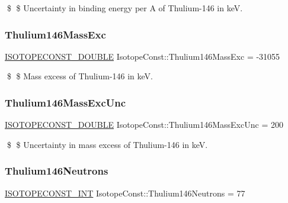 \$ \$ Uncertainty in binding energy per A of Thulium-\/146 in keV. \mbox{\label{group___isotope_const-_thulium-_tm146_ga506451444ec185ead3cec387ee123927}} 
\subsubsection{\texorpdfstring{Thulium146\+Mass\+Exc}{Thulium146MassExc}}
{\footnotesize\ttfamily \mbox{\hyperlink{group___isotope_const-_macros_ga8f45a7272ce02c0b4c65c44636ed719a}{I\+S\+O\+T\+O\+P\+E\+C\+O\+N\+S\+T\+\_\+\+D\+O\+U\+B\+LE}} Isotope\+Const\+::\+Thulium146\+Mass\+Exc = -\/31055}

\$ \$ Mass excess of Thulium-\/146 in keV. \mbox{\label{group___isotope_const-_thulium-_tm146_gaaa94e9472a33894624d9fe4f1e47a3f6}} 
\subsubsection{\texorpdfstring{Thulium146\+Mass\+Exc\+Unc}{Thulium146MassExcUnc}}
{\footnotesize\ttfamily \mbox{\hyperlink{group___isotope_const-_macros_ga8f45a7272ce02c0b4c65c44636ed719a}{I\+S\+O\+T\+O\+P\+E\+C\+O\+N\+S\+T\+\_\+\+D\+O\+U\+B\+LE}} Isotope\+Const\+::\+Thulium146\+Mass\+Exc\+Unc = 200}

\$ \$ Uncertainty in mass excess of Thulium-\/146 in keV. \mbox{\label{group___isotope_const-_thulium-_tm146_gac6fc4695076f5225be69d0a8f3e4bdee}} 
\subsubsection{\texorpdfstring{Thulium146\+Neutrons}{Thulium146Neutrons}}
{\footnotesize\ttfamily \mbox{\hyperlink{group___isotope_const-_macros_ga5f18360b3e99483a35c32d789e62621c}{I\+S\+O\+T\+O\+P\+E\+C\+O\+N\+S\+T\+\_\+\+I\+NT}} Isotope\+Const\+::\+Thulium146\+Neutrons = 77}

